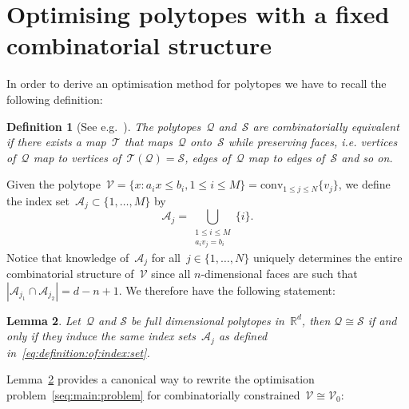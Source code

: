\documentclass[letterpaper, 10pt, conference]{ieeeconf} %
\newtheorem{thm}{Lemma}[section]
\newtheorem{defn}[thm]{Definition}
\providecommand{\abs}[1]{\left\lvert#1\right\rvert}
\begin{document}
\section{Optimising polytopes with a fixed combinatorial structure}\label{sec:optimising:polytopes}
%
%
%
\noindent In order to derive an optimisation method for polytopes we have to recall the following definition:
%
\begin{defn}[See e.g.~\cite{Ziegler:1995}]
The polytopes~$\mathcal Q$ and~$\mathcal S$ are combinatorially equivalent if there exists a map~$\mathcal T$ that maps~$\mathcal Q$ onto~$\mathcal S$ while preserving faces, i.e. vertices of~$\mathcal Q$ map to vertices of~$\mathcal T(\mathcal Q)=\mathcal S$, edges of~$\mathcal Q$ map to edges of~$\mathcal S$ and so on.
\end{defn}
%
Given the polytope~$\mathcal V = \{x:a_ix\leq b_i,1\leq i\leq M\}=\text{conv}_{1\leq j\leq N}\{v_j\}$, we define the index set~$\mathcal A_j\subset\{1,\dots,M\}$ by
%
\begin{equation}\label{eq:definition:of:index:set}
	\mathcal A_j = \bigcup_{\substack{1\leq i\leq M\\ a_i v_j=b_i}}\{i\}.
\end{equation}
%
Notice that knowledge of~$\mathcal A_j$ for all~$j\in\{1,\dots,N\}$ uniquely determines the entire combinatorial structure of~$\mathcal V$ since all $n$-dimensional faces are such that $\abs{\mathcal A_{j_1}\cap\mathcal A_{j_2}}=d-n+1$.
%
We therefore have the following statement:
%
\begin{thm}\label{thm:combinatorial:equivalence}
Let~$\mathcal Q$ and $\mathcal S$ be full dimensional polytopes in~$\mathbb R^d$, then $\mathcal Q\cong\mathcal S$ if and only if they induce the same index sets~$\mathcal A_j$ as defined in~\eqref{eq:definition:of:index:set}.
\end{thm}
%
Lemma~\ref{thm:combinatorial:equivalence} provides a canonical way to rewrite the optimisation problem~\eqref{seq:main:problem} for combinatorially constrained~$\mathcal V\cong\mathcal V_0$:
%
\end{document}
